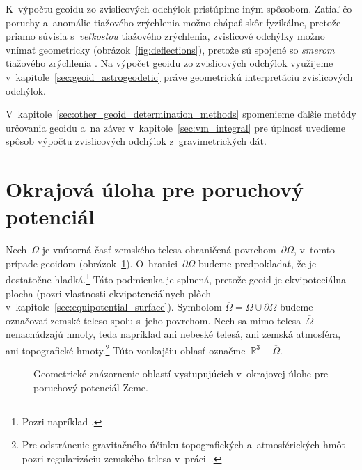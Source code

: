\documentclass[a4paper, 12pt]{book}
\begin{document}
K~výpočtu geoidu zo zvislicových odchýlok pristúpime iným spôsobom.  Zatiaľ čo 
poruchy a~anomálie tiažového zrýchlenia možno chápať skôr fyzikálne, pretože 
priamo súvisia s~\emph{veľkosťou} tiažového zrýchlenia, zvislicové odchýlky 
možno vnímať geometricky (obrázok~\ref{fig:deflections}), pretože sú spojené so 
\emph{smerom} tiažového zrýchlenia \parencite{MoritzPhysicalGeodesy}.  Na 
výpočet geoidu zo zvislicových odchýlok využijeme 
v~kapitole~\ref{sec:geoid_astrogeodetic} práve geometrickú interpretáciu 
zvislicových odchýlok.

V~kapitole~\ref{sec:other_geoid_determination_methods} spomenieme ďalšie metódy 
určovania geoidu a~na záver v~kapitole~\ref{sec:vm_integral} pre úplnosť 
uvedieme spôsob výpočtu zvislicových odchýlok z~gravimetrických dát.


\section{Okrajová úloha pre poruchový potenciál}
\label{sec:boundary_value_problem}

Nech~$\Omega$ je vnútorná časť zemského telesa ohraničená povrchom~$\partial 
\Omega$, v~tomto prípade geoidom (obrázok~\ref{fig:boundary_value_problems}).  
O~hranici~$\partial \Omega$ budeme predpokladať, že je dostatočne 
hladká.\footnote{Pozri napríklad \textcite{SansoGeoidDetermination}.}  Táto 
podmienka je splnená, pretože geoid je ekvipoteciálna plocha (pozri vlastnosti 
ekvipotenciálnych plôch v~kapitole~\ref{sec:equipotential_surface}).  Symbolom 
$\overline{\Omega} = \Omega \cup \partial\Omega$ budeme označovať zemské teleso 
spolu s~jeho povrchom.  Nech sa mimo telesa~$\overline{\Omega}$ nenachádzajú 
hmoty, teda napríklad ani nebeské telesá, ani zemská atmosféra, ani 
topografické hmoty.\footnote{Pre odstránenie gravitačného účinku topografických 
a~atmosférických hmôt pozri regularizáciu zemského telesa 
v~práci~\textcite{Janak2006}.}  Túto vonkajšiu oblasť označme~$\mathbb{R}^3 
- \overline{\Omega}$.

\begin{figure}[bt]
\centering

\caption{Geometrické znázornenie oblastí vystupujúcich v~okrajovej úlohe pre 
poruchový potenciál Zeme.}
\label{fig:boundary_value_problems}
\end{figure}
\end{document}

